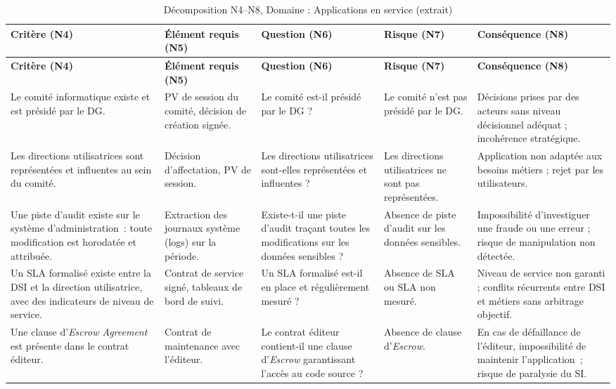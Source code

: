 \small
\begin{longtable}{p{2.8cm}p{2.7cm}p{2.7cm}p{2.4cm}p{2.6cm}}
\caption{Décomposition N4--N8, Domaine : Applications en service (extrait)} \\
\toprule
\textbf{Critère (N4)} & \textbf{Élément requis (N5)} & \textbf{Question (N6)} & \textbf{Risque (N7)} & \textbf{Conséquence (N8)} \\
\midrule
\endfirsthead
\toprule
\textbf{Critère (N4)} & \textbf{Élément requis (N5)} & \textbf{Question (N6)} & \textbf{Risque (N7)} & \textbf{Conséquence (N8)} \\
\midrule
\endhead
\bottomrule
\endlastfoot

Le comité informatique existe et est présidé par le DG. &
PV de session du comité, décision de création signée. &
Le comité est-il présidé par le DG ? &
Le comité n'est pas présidé par le DG. &
Décisions prises par des acteurs sans niveau décisionnel adéquat ; incohérence stratégique. \\
\addlinespace

Les directions utilisatrices sont représentées et influentes au sein du comité. &
Décision d'affectation, PV de session. &
Les directions utilisatrices sont-elles représentées et influentes ? &
Les directions utilisatrices ne sont pas représentées. &
Application non adaptée aux besoins métiers ; rejet par les utilisateurs. \\
\addlinespace

Une piste d'audit existe sur le système d'administration~: toute modification est horodatée et attribuée. &
Extraction des journaux système (logs) sur la période. &
Existe-t-il une piste d'audit traçant toutes les modifications sur les données sensibles ? &
Absence de piste d'audit sur les données sensibles. &
Impossibilité d'investiguer une fraude ou une erreur ; risque de manipulation non détectée. \\
\addlinespace

Un SLA formalisé existe entre la DSI et la direction utilisatrice, avec des indicateurs de niveau de service. &
Contrat de service signé, tableaux de bord de suivi. &
Un SLA formalisé est-il en place et régulièrement mesuré ? &
Absence de SLA ou SLA non mesuré. &
Niveau de service non garanti ; conflits récurrents entre DSI et métiers sans arbitrage objectif. \\
\addlinespace

Une clause d'\textit{Escrow Agreement} est présente dans le contrat éditeur. &
Contrat de maintenance avec l'éditeur. &
Le contrat éditeur contient-il une clause d'\textit{Escrow} garantissant l'accès au code source ? &
Absence de clause d'\textit{Escrow}. &
En cas de défaillance de l'éditeur, impossibilité de maintenir l'application~; risque de paralysie du SI. \\

\end{longtable}

